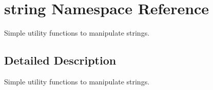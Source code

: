 \hypertarget{namespacestring}{}\section{string Namespace Reference}
\label{namespacestring}


Simple utility functions to manipulate strings.  




\subsection{Detailed Description}
Simple utility functions to manipulate strings. 